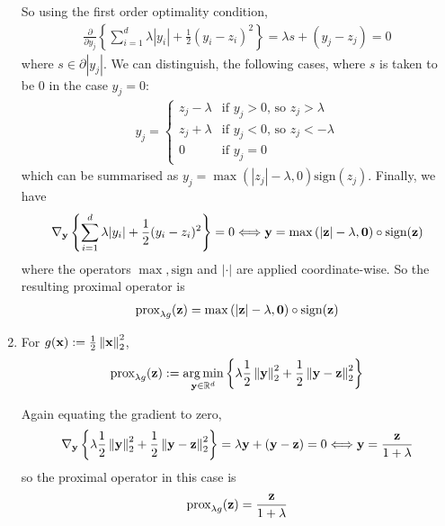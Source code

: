\documentclass{article}
\begin{document}
\begin{enumerate}[label=1.I.\arabic*]
    So using the first order optimality condition,
    \begin{align}
       \frac{\partial}{\partial y_j} \left\lbrace \sum_{i=1}^d \lambda |y_i| + \frac{1}{2} (y_i-z_i)^2 \right\rbrace =  \lambda s + (y_j-z_j) = 0
    \end{align}
    where $s \in \partial |y_j |$. We can distinguish, the following cases, where $s$ is taken to be 0 in the case $y_j=0$:
    \begin{align}
        y_j =
        \begin{cases}
            z_j - \lambda &\text{if $y_j>0$, so $z_j > \lambda$} \\
            z_j + \lambda &\text{if $y_j<0$, so $z_j < -\lambda$} \\
            0 &\text{if }y_j=0
        \end{cases}
    \end{align}
    which can be summarised as $y_j = \max{(|z_j|-\lambda, 0)}\text{sign}(z_j)$. Finally, we have
    \begin{align}
         \nabla_{\mathbf{y}} \left\lbrace \sum_{i=1}^d \lambda |y_i| + \frac{1}{2} (y_i-z_i)^2 \right\rbrace = 0 \Longleftrightarrow \mathbf{y} = \max{(|\mathbf{z}|-\lambda, \mathbf{0})}\circ \text{sign}(\mathbf{z})
    \end{align}
    where the operators $\max, \text{sign}$ and $|\cdot|$ are applied coordinate-wise. So the resulting proximal operator is
    \begin{align}
        \text{prox}_{\lambda g}(\mathbf{z}) = \max{(|\mathbf{z}|-\lambda, \mathbf{0})}\circ 
        \text{sign}(\mathbf{z})
    \end{align}
    
    \item For $g(\mathbf{x}):=\frac{1}{2}\left\lVert\mathbf{x}\right\rVert_2^2$,
    \begin{align}
        \text{prox}_{\lambda g}(\mathbf{z}) := \operatorname*{arg\,min}_{\mathbf{y} \in \mathbb{R}^d} \left\lbrace \lambda \frac{1}{2}\left\lVert\mathbf{y}\right\rVert_2^2 + \frac{1}{2} \left\lVert\mathbf{y} - \mathbf{z}\right\rVert^2_2\right\rbrace
    \end{align}
    
    Again equating the gradient to zero,
    \begin{align}
        \nabla_{\mathbf{y}} \left\lbrace \lambda \frac{1}{2}\left\lVert\mathbf{y}\right\rVert_2^2 + \frac{1}{2} \left\lVert\mathbf{y} - \mathbf{z}\right\rVert^2_2\right\rbrace = \lambda \mathbf{y} + (\mathbf{y} - \mathbf{z}) = 0 \Longleftrightarrow \mathbf{y} = \frac{\mathbf{z}}{1+\lambda}
    \end{align}
    so the proximal operator in this case is
    \begin{align}
        \text{prox}_{\lambda g}(\mathbf{z}) = \frac{\mathbf{z}}{1+\lambda}
    \end{align}
\end{enumerate}
\end{document}
